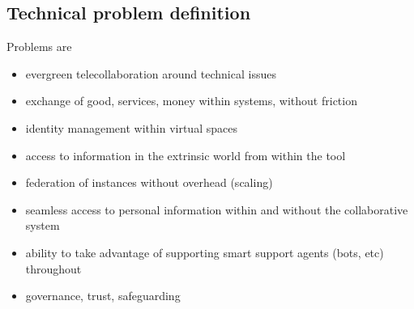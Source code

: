 \subsection{Technical problem definition}
Problems are
\begin{itemize}
\item evergreen telecollaboration around technical issues
\item exchange of good, services, money within systems, without friction
\item identity management within virtual spaces
\item access to information in the extrinsic world from within the tool
\item federation of instances without overhead (scaling)
\item seamless access to personal information within and without the collaborative system
\item ability to take advantage of supporting smart support agents (bots, etc) throughout
\item governance, trust, safeguarding
\end{itemize}

